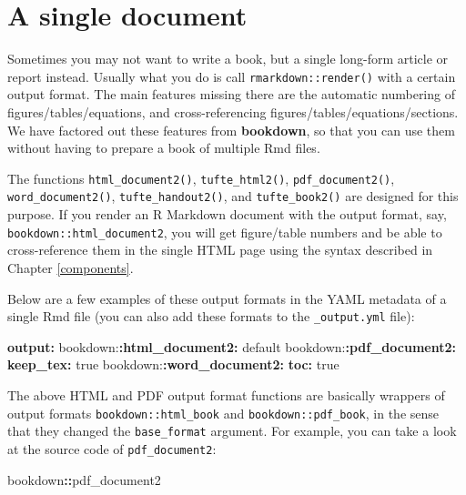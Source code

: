 \documentclass[
  12pt,
]{krantz}
\newenvironment{Shaded}{\begin{snugshade}}{\end{snugshade}}
\newcommand{\AttributeTok}[1]{\textcolor[rgb]{0.13,0.29,0.53}{#1}}
\newcommand{\CharTok}[1]{\textcolor[rgb]{0.31,0.60,0.02}{#1}}
\newcommand{\FunctionTok}[1]{\textcolor[rgb]{0.13,0.29,0.53}{\textbf{#1}}}
\newcommand{\KeywordTok}[1]{\textcolor[rgb]{0.13,0.29,0.53}{\textbf{#1}}}
\newcommand{\NormalTok}[1]{#1}
\newcommand{\SpecialCharTok}[1]{\textcolor[rgb]{0.81,0.36,0.00}{\textbf{#1}}}
\theoremstyle{definition}
\theoremstyle{definition}
\theoremstyle{definition}
\theoremstyle{definition}
\theoremstyle{remark}
\begin{document}
\section{A single document}\label{a-single-document}

Sometimes you may not want to write a book, but a single long-form article or report instead. Usually what you do is call \texttt{rmarkdown::render()} with a certain output format. The main features missing there are the automatic numbering of figures/tables/equations, and cross-referencing figures/tables/equations/sections. We have factored out these features from \textbf{bookdown}, so that you can use them without having to prepare a book of multiple Rmd files.

The functions \texttt{html\_document2()}, \texttt{tufte\_html2()}, \texttt{pdf\_document2()}, \texttt{word\_document2()}, \texttt{tufte\_handout2()}, and \texttt{tufte\_book2()} are designed for this purpose. If you render an R Markdown document with the output format, say, \texttt{bookdown::html\_document2}, you will get figure/table numbers and be able to cross-reference them in the single HTML page using the syntax described in Chapter \ref{components}.

Below are a few examples of these output formats in the YAML metadata of a single Rmd file (you can also add these formats to the \texttt{\_output.yml} file):

\begin{Shaded}
\begin{Highlighting}[]
\FunctionTok{output}\KeywordTok{:}
\AttributeTok{  bookdown:}\FunctionTok{:html\_document2}\KeywordTok{:}\AttributeTok{ default}
\AttributeTok{  bookdown:}\FunctionTok{:pdf\_document2}\KeywordTok{:}
\AttributeTok{    }\FunctionTok{keep\_tex}\KeywordTok{:}\AttributeTok{ }\CharTok{true}
\AttributeTok{  bookdown:}\FunctionTok{:word\_document2}\KeywordTok{:}
\AttributeTok{    }\FunctionTok{toc}\KeywordTok{:}\AttributeTok{ }\CharTok{true}
\end{Highlighting}
\end{Shaded}

The above HTML and PDF output format functions are basically wrappers of output formats \texttt{bookdown::html\_book} and \texttt{bookdown::pdf\_book}, in the sense that they changed the \texttt{base\_format} argument. For example, you can take a look at the source code of \texttt{pdf\_document2}:

\begin{Shaded}
\begin{Highlighting}[]
\NormalTok{bookdown}\SpecialCharTok{::}\NormalTok{pdf\_document2}
\end{Highlighting}
\end{Shaded}
\end{document}
